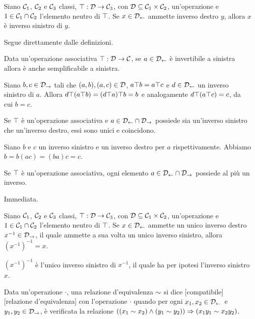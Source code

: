 \begin{Theorem}
	Siano $\Class_1$, $\Class_2$ e $\Class_3$ classi, $\Operation: \Domain \rightarrow \Class_3$, con $\Domain \subseteq \Class_1 \times \Class_2$, un'operazione e $1 \in \Class_1 \cap \Class_2$ l'elemento neutro di $\Operation$. Se $x \in \LeftArguments{\Operation}$ ammette inverso destro $y$, allora $x$ \`e inverso sinistro di $y$.
\end{Theorem}
\Proof Segue direttamente dalle definizioni. \EndProof
\begin{Theorem}
	Data un'operazione associativa $\Operation: \Domain \rightarrow \Class$, se $a \in \LeftArguments{\Operation}$ \`e invertibile a sinistra allora \`e anche semplificabile a sinistra.
\end{Theorem}
\Proof Siano $b, c \in \RightArguments{\Operation}$ tali che $(a,b), (a,c) \in \Domain$, $a \Operation b = a \Operation c$ e $d \in \LeftArguments{a}$ un inverso sinistro di $a$. Allora $d \Operation (a \Operation b) = (d \Operation a) \Operation b = b$ e analogamente $d \Operation (a \Operation c) = c$, da cui $b = c$. \EndProof
\begin{Theorem}
	Se $\Operation$ \`e un'operazione associativa e $a \in \LeftArguments{\Operation} \cap \RightArguments{\Operation}$ possiede sia un'inverso sinistro che un'inverso destro, essi sono unici e coincidono.
\end{Theorem}
\Proof Siano $b$ e $c$ un inverso sinistro e un inverso destro per $a$ rispettivamente. Abbiamo $b = b(ac) = (ba)c = c$. \EndProof
\begin{Corollary}
	Se $\Operation$ \`e un'operazione associativa, ogni elemento $a \in \LeftArguments{\Operation} \cap \RightArguments{\Operation}$ possiede al pi\`u un inverso.
\end{Corollary}
\Proof Immediata. \EndProof
\begin{Theorem}
	Siano $\Class_1$, $\Class_2$ e $\Class_3$ classi, $\Operation: \Domain \rightarrow \Class_3$, con $\Domain \subseteq \Class_1 \times \Class_2$, un'operazione e $1 \in \Class_1 \cap \Class_2$ l'elemento neutro di $\Operation$. Se $x \in \LeftArguments{\Operation}$ ammette un unico inverso destro $x^{-1} \in \RightArguments{\Operation}$, il quale ammette a sua volta un unico inverso sinistro, allora $\left ( x^{-1} \right )^{-1} = x$.
\end{Theorem}
\Proof $(x^{-1})^{-1}$ \`e l'unico inverso sinistro di $x^{-1}$, il quale ha per ipotesi l'inverso sinistro $x$. \EndProof
\begin{Definition}
	Data un'operazione $\cdot$, una relazione d'equivalenza $\Equivalence$ si dice [compatibile][relazione d'equivalenza] con l'operazione $\cdot$ quando per ogni $x_1, x_2 \in \LeftArguments{\cdot}$ e $y_1, y_2 \in \RightArguments{\cdot}$, \`e verificata la relazione $\Implies{\And{x_1 \Equivalence x_2}{y_1 \Equivalence y_2}}{x_1y_1 \Equivalence x_2y_2}$.
\end{Definition}
